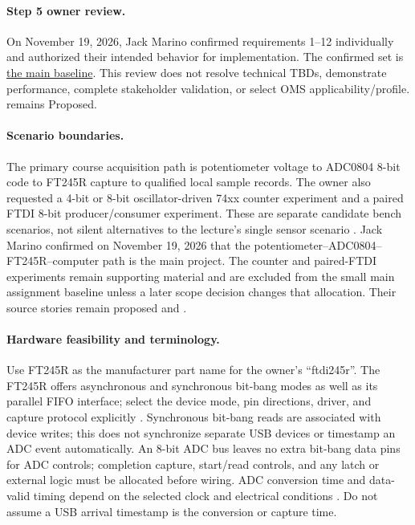 \paragraph{Step 5 owner review.}\label{Section:MainRequirementReview}
On November 19, 2026, Jack Marino confirmed requirements 1--12 individually and authorized their intended behavior for implementation. The confirmed set is \hyperref[Table:MainBaseline]{the main baseline}. This review does not resolve technical TBDs, demonstrate performance, complete stakeholder validation, or select OMS applicability/profile.  remains Proposed.

\paragraph{Scenario boundaries.}
The primary course acquisition path is potentiometer voltage to ADC0804
8-bit code to FT245R capture to qualified local sample records. The owner also
requested a 4-bit or 8-bit oscillator-driven 74xx counter experiment and a
paired FTDI 8-bit producer/consumer experiment. These are separate candidate
bench scenarios, not silent alternatives to the lecture's single sensor
scenario \cite[slide 5]{SPE800Week02}. Jack Marino confirmed on November 19, 2026 that the potentiometer--ADC0804--
FT245R--computer path is the main project. The counter and paired-FTDI
experiments remain supporting material and are excluded from the small main
assignment baseline unless a later scope decision changes that allocation.
Their source stories remain proposed
 and .

\paragraph{Hardware feasibility and terminology.}
Use FT245R as the manufacturer part name for the owner's ``ftdi245r''.
The FT245R offers asynchronous and synchronous bit-bang modes as well as
its parallel FIFO interface; select the device mode, pin directions,
driver, and capture protocol explicitly \cite{FT245RData,FTDIBitBang}.
Synchronous bit-bang reads are associated with device writes; this does not
synchronize separate USB devices or timestamp an ADC event automatically.
An 8-bit ADC bus leaves no extra bit-bang data pins for ADC controls;
completion capture, start/read controls, and any latch or external logic
must be allocated before wiring. ADC conversion time and data-valid timing
depend on the selected clock and electrical conditions \cite{TIADC0804}.
Do not assume a USB arrival timestamp is the conversion or capture time.


